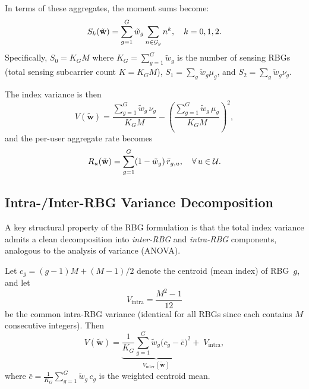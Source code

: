 In terms of these aggregates, the moment sums become:
\begin{equation}
  S_k(\tilde{\mathbf{w}}) = \sum_{g=1}^{G} \tilde{w}_g \sum_{n \in \mathcal{G}_g} n^k, \quad k = 0, 1, 2.
  \label{eq:moments_rbg}
\end{equation}
Specifically, $S_0 = K_G M$ where $K_G = \sum_{g=1}^{G} \tilde{w}_g$ is the number of sensing RBGs (total sensing subcarrier count $K = K_G M$), $S_1 = \sum_g \tilde{w}_g \mu_g$, and $S_2 = \sum_g \tilde{w}_g \nu_g$.

The index variance is then
\begin{equation}
  V(\tilde{\mathbf{w}}) = \frac{\sum_{g=1}^{G} \tilde{w}_g \, \nu_g}{K_G M}
                         - \left(\frac{\sum_{g=1}^{G} \tilde{w}_g \, \mu_g}{K_G M}\right)^{\!2},
  \label{eq:var_rbg}
\end{equation}
and the per-user aggregate rate becomes
\begin{equation}
  R_u(\tilde{\mathbf{w}}) = \sum_{g=1}^{G} (1 - \tilde{w}_g)\, \bar{r}_{g,u}, \quad \forall\, u \in \mathcal{U}.
  \label{eq:rate_rbg_total}
\end{equation}

\subsection{Intra-/Inter-RBG Variance Decomposition}
\label{subsec:variance_decomp}

A key structural property of the RBG formulation is that the total index variance admits a clean decomposition into \emph{inter-RBG} and \emph{intra-RBG} components, analogous to the analysis of variance (ANOVA).

\begin{proposition}
\label{prop:var_decomp}
Let $c_g = (g - 1)M + (M-1)/2$ denote the centroid (mean index) of RBG~$g$, and let
\begin{equation}
  V_{\mathrm{intra}} = \frac{M^2 - 1}{12}
  \label{eq:v_intra}
\end{equation}
be the common intra-RBG variance (identical for all RBGs since each contains $M$ consecutive integers).
Then
\begin{equation}
  V(\tilde{\mathbf{w}}) = \underbrace{\frac{1}{K_G} \sum_{g=1}^{G} \tilde{w}_g \big(c_g - \bar{c}\big)^2}_{V_{\mathrm{inter}}(\tilde{\mathbf{w}})}
                        + \; V_{\mathrm{intra}},
  \label{eq:anova}
\end{equation}
where $\bar{c} = \frac{1}{K_G}\sum_{g=1}^{G} \tilde{w}_g \, c_g$ is the weighted centroid mean.
\end{proposition}

